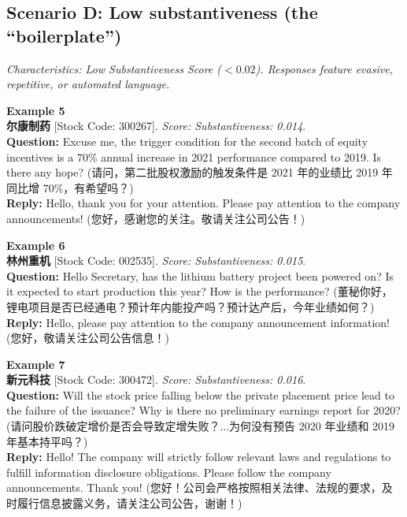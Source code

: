 \documentclass[12pt]{article}
\begin{document}
\subsection{Scenario D: Low substantiveness (the ``boilerplate'')}
\textit{Characteristics: Low Substantiveness Score ($< 0.02$). Responses feature evasive, repetitive, or automated language.}
\vspace{0.3cm}

\noindent \textbf{Example 5} \\
\textbf{尔康制药} [Stock Code: 300267]. \textit{Score: Substantiveness: 0.014}. \\
\textbf{Question:} Excuse me, the trigger condition for the second batch of equity incentives is a 70\% annual increase in 2021 performance compared to 2019. Is there any hope? (请问，第二批股权激励的触发条件是 2021 年的业绩比 2019 年同比增 70\%，有希望吗？) \\
\textbf{Reply:} Hello, thank you for your attention. Please pay attention to the company announcements! (您好，感谢您的关注。敬请关注公司公告！)
\vspace{0.4cm}

\noindent \textbf{Example 6} \\
\textbf{林州重机} [Stock Code: 002535]. \textit{Score: Substantiveness: 0.015}. \\
\textbf{Question:} Hello Secretary, has the lithium battery project been powered on? Is it expected to start production this year? How is the performance? (董秘你好，锂电项目是否已经通电？预计年内能投产吗？预计达产后，今年业绩如何？) \\
\textbf{Reply:} Hello, please pay attention to the company announcement information! (您好，敬请关注公司公告信息！)
\vspace{0.4cm}

\noindent \textbf{Example 7} \\
\textbf{新元科技} [Stock Code: 300472]. \textit{Score: Substantiveness: 0.016}. \\
\textbf{Question:} Will the stock price falling below the private placement price lead to the failure of the issuance? Why is there no preliminary earnings report for 2020? (请问股价跌破定增价是否会导致定增失败？...为何没有预告 2020 年业绩和 2019 年基本持平吗？) \\
\textbf{Reply:} Hello! The company will strictly follow relevant laws and regulations to fulfill information disclosure obligations. Please follow the company announcements. Thank you! (您好！公司会严格按照相关法律、法规的要求，及时履行信息披露义务，请关注公司公告，谢谢！)
\vspace{0.6cm}
\end{document}
